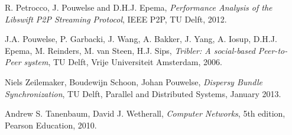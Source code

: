 \documentclass[pdftex, 10pt, a4paper]{report}
\begin{document}
\pagestyle{fancy}
\fancyhead{}
\fancyhead[LE, LO] {\today}



\tableofcontents

\pagebreak


\begin{thebibliography}{9}

   R. Petrocco, J. Pouwelse and D.H.J. Epema,
  \emph{Performance Analysis of the Libswift P2P Streaming Protocol},
  IEEE P2P, TU Delft,
  2012.

   J.A. Pouwelse, P. Garbacki, J. Wang, A. Bakker, J. Yang, A. Iosup, D.H.J. Epema, M. Reinders, M. van Steen, H.J. Sips,
  \emph{Tribler: A social-based Peer-to-Peer system},
  TU Delft, Vrije Universiteit Amsterdam,
  2006.

   Niels Zeilemaker, Boudewijn Schoon, Johan Pouwelse,
  \emph{Dispersy Bundle Synchronization},
  TU Delft, Parallel and Distributed Systems,
  January 2013.

		 Andrew S. Tanenbaum, David J. Wetherall,
 		\emph{Computer Networks},
		5th edition,
		Pearson Education,
		2010.

\end{thebibliography}
\end{document}
